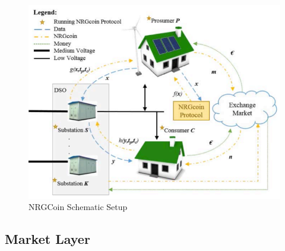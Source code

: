 \begin{figure}[h!]
    \centering
    \includegraphics[scale=0.8]{Figures/nrgcoin.png}
    \caption{NRGCoin Schematic Setup \cite{NRGCoin}}
\end{figure}

\subsection{Market Layer}

